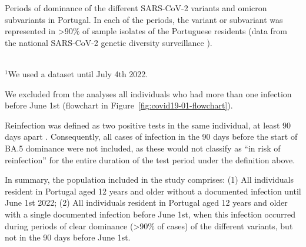 \begin{table}
    \centering
    \caption[Periods of dominance of the different SARS-CoV-2 variants and omicron subvariants in Portugal]{Periods of dominance of the different SARS-CoV-2 variants and omicron subvariants in Portugal. In each of the periods, the variant or subvariant was represented in >90\% of sample isolates of the Portuguese residents (data from the national SARS-CoV-2 genetic diversity surveillance \citep{institutonacionaldesaudedoutorricardojorge2022GeneticDiversity}).}
    
    \label{tab:tabs2-periods-dominance}
    \\
    {\scriptsize $^1$We used a dataset until July 4th 2022.}
\end{table}

We excluded from the analyses all individuals who had more than one infection before June 1st (flowchart in Figure~\ref{fig:covid19-01-flowchart}).

Reinfection was defined as two positive tests in the same individual, at least 90 days apart \citep{worldhealthorganizaton2022PublicHealth}. Consequently, all cases of infection in the 90 days before the start of BA.5 dominance were not included, as these would not classify as ``in risk of reinfection'' for the entire duration of the test period under the definition above.

In summary, the population included in the study comprises: (1) All individuals resident in Portugal aged 12 years and older without a documented infection until June 1st 2022; (2) All individuals resident in Portugal aged 12 years and older with a single documented infection before June 1st, when this infection occurred during periods of clear dominance (>90\% of cases) of the different variants, but not in the 90 days before June 1st.

